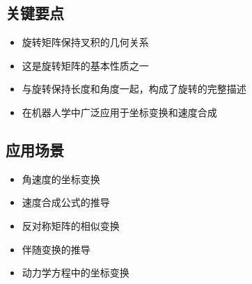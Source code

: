 \documentclass[12pt,a4paper]{article}
\begin{document}
\subsection{关键要点}

\begin{itemize}
\item 旋转矩阵保持叉积的几何关系
\item 这是旋转矩阵的基本性质之一
\item 与旋转保持长度和角度一起，构成了旋转的完整描述
\item 在机器人学中广泛应用于坐标变换和速度合成
\end{itemize}

\subsection{应用场景}

\begin{itemize}
\item 角速度的坐标变换
\item 速度合成公式的推导
\item 反对称矩阵的相似变换
\item 伴随变换的推导
\item 动力学方程中的坐标变换
\end{itemize}
\end{document}
